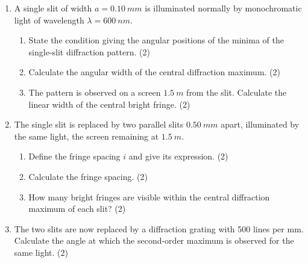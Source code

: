 \documentclass[11pt]{article}
\begin{document}
\begin{exercice}
\begin{enumerate}
\item A single slit of width $a = \SI{0.10}{mm}$ is illuminated normally by monochromatic light of wavelength $\lambda = \SI{600}{nm}$.
\begin{enumerate}
\item State the condition giving the angular positions of the minima of the single-slit diffraction pattern. \hfill (2)
\item Calculate the angular width of the central diffraction maximum. \hfill (2)
\item The pattern is observed on a screen $\SI{1.5}{m}$ from the slit. Calculate the linear width of the central bright fringe. \hfill (2)
\end{enumerate}
\item The single slit is replaced by two parallel slits $\SI{0.50}{mm}$ apart, illuminated by the same light, the screen remaining at $\SI{1.5}{m}$.
\begin{enumerate}
\item Define the fringe spacing $i$ and give its expression. \hfill (2)
\item Calculate the fringe spacing. \hfill (2)
\item How many bright fringes are visible within the central diffraction maximum of each slit? \hfill (2)
\end{enumerate}
\item The two slits are now replaced by a diffraction grating with 500 lines per mm. Calculate the angle at which the second-order maximum is observed for the same light. \hfill (2)
\end{enumerate}
\end{exercice}
\end{document}
